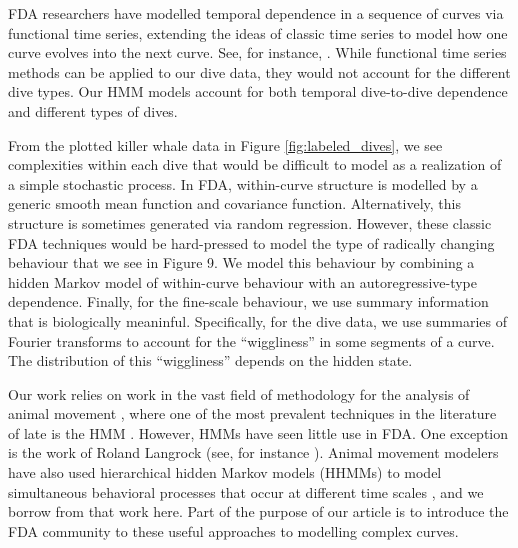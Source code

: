 FDA researchers have modelled temporal dependence in a sequence of curves  via functional time series, extending the ideas of classic time series to model how one curve evolves into the next curve.  See, for instance, \cite{Kokoszka:2018}. 
While  functional time series methods can be applied to our dive data, they would not account for the different dive types.
Our HMM models account for both temporal dive-to-dive dependence and different types of dives.


 

From the plotted killer whale data in Figure {\ref{fig:labeled_dives}}, we see complexities within each dive that would be difficult to model as a realization of a simple stochastic process. 
In FDA, within-curve structure is modelled by a generic smooth mean function and covariance function.
Alternatively, this structure is sometimes generated via random regression.
However, these classic FDA techniques would be hard-pressed to model the type of radically changing behaviour that we see in Figure 9.
We model this behaviour by combining a hidden Markov model of within-curve behaviour with an autoregressive-type dependence. Finally, for the fine-scale behaviour, we use summary information that is biologically meaninful.   Specifically, for the dive data, we use summaries of Fourier transforms to account for the ``wiggliness'' in some segments of a curve. The distribution of this ``wiggliness'' depends on the hidden state.



Our work relies on work in the vast field of methodology for the analysis of animal movement
\citep{Hooten:2017,Mcclintock:2020}, where
one of the most prevalent techniques in the literature of late is the HMM \citep{Patterson:2017}. 
However, HMMs have seen little use in FDA.  
One exception is the work of Roland Langrock (see, for instance \citealt{Langrock:2018}).
Animal movement modelers have also used  hierarchical hidden Markov models (HHMMs) to model  simultaneous behavioral processes that occur at different time scales \citep{Barajas:2017,Adam:2019}, and we borrow from that work here. 
Part of the purpose of our article is to introduce the FDA community to these useful approaches to modelling complex curves. 

